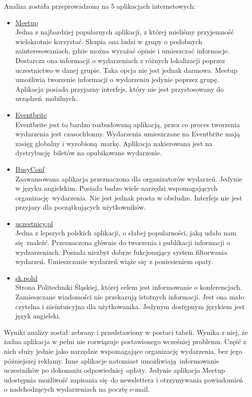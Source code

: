 Analiza została przeprowadzona na 5 aplikacjach internetowych:
\begin{itemize}
  \item \href{http://www.meetup.com/}{Meetup} \\
  Jedna z najbardziej popularnych aplikacji, z której mieliśmy przyjemność wielokrotnie korzystać. Skupia ona ludzi w grupy o podobnych zainteresowaniach, gdzie można wyrażać opinie i umieszczać informacje. Dostarcza ona informacji o wydarzeniach z różnych lokalizacji poprzez uczestnictwo w danej grupie. Taka opcja nie jest jednak darmowa. Meetup umożliwia tworzenie informacji o wydarzeniu jedynie poprzez grupę. Aplikacja posiada przyjazny interfejs, który nie jest przystosowany do urządzeń mobilnych.
  \item \href{https://www.eventbrite.com/}{Eventbrite} \\
  Eventbrite jest to bardzo rozbudowaną aplikacją, przez co proces tworzenia wydarzenia jest czasochłonny. Wydarzenia umieszczane na Eventbrite mają zasięg globalny i wyrobioną markę. Aplikacja nakierowana jest na dystrybucję biletów na opubikowane wydarzenie.
  \item \href{http://busyconf.com/}{BusyConf} \\
  Zaawansowana aplikacja przeznaczona dla organizatorów wydarzeń. Jedynie w języku angielskim. Posiada badzo wiele narzędzi wspomagających organizację wydarzenia. Nie jest jednak prosta w obsłudze. Interfejs nie jest przyjazy dla początkujących użytkowników.
  \item \href{www.uczestnicy.pl/}{uczestnicy.pl} \\
  Jedna z lepszych polskich aplikacji, o słabej popularności, jaką udało nam się znaleźć. Przeznaczona głównie do tworzenia i publikacji informacji o wydzarzeniach. Posiada niezbyt dobrze fukcjonujący system filtorwania wydarzeń. Umieszczanie wydarzeń wiąże się z poniesieniem opaty.
  \item \href{http://sk.polsl.pl/}{sk.polsl} \\
  Strona Politechniki Śląskiej, której celem jest informowanie o konferencjach. Zamieszczane wiadomości nie przekazują istotnych informacji. Jest ona mało czytelna i nieintuicyjna dla użytkowanika. Jedynym dostępnym językiem jest język angielski.
\end{itemize}


Wyniki analizy został zebrany i przedstawiony w postaci tabeli. Wynika z niej, że żadna aplikacja w pełni nie rozwiązuje postawionego wcześniej problemu. Część z nich służy jednie jako narzędzie wspomagające organizację wydarzenia, bez jego późniejszej reklamy. Inne aplikacje natomiast umożliwiają informowanie uczestników po dokonaniu odpowiedniej opłaty. Jedynie aplikacja Meetup udostępnia możliwość zapisania się do newslettera i otrzymywania powiadomień o nadchodzących wydarzeniach na pocztę e-mail.


